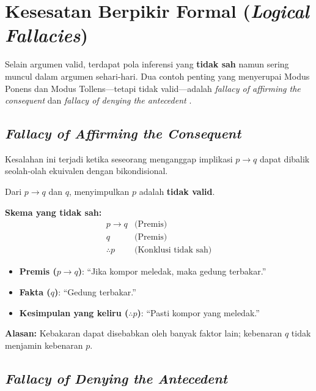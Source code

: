 \section{Kesesatan Berpikir Formal (\textit{Logical Fallacies})}

Selain argumen valid, terdapat pola inferensi yang \textbf{tidak sah} namun sering muncul dalam argumen sehari-hari. Dua contoh penting yang menyerupai Modus Ponens dan Modus Tollens---tetapi tidak valid---adalah \textit{fallacy of affirming the consequent} dan \textit{fallacy of denying the antecedent} \cite{rosen2019,iep_natded,libretexts_proofs}.

\subsection{\textit{Fallacy of Affirming the Consequent}}

Kesalahan ini terjadi ketika seseorang menganggap implikasi $p \rightarrow q$ dapat dibalik seolah-olah ekuivalen dengan bikondisional.

\begin{teorema}
Dari $p \rightarrow q$ dan $q$, menyimpulkan $p$ adalah \textbf{tidak valid}.
\end{teorema}

\textbf{Skema yang tidak sah:}
\[
\begin{array}{cl}
p \rightarrow q & \text{(Premis)} \\
q & \text{(Premis)} \\
\hline
\therefore p & \text{(Konklusi tidak sah)}
\end{array}
\]

\begin{contoh}
\begin{itemize}
    \item \textbf{Premis ($p \rightarrow q$)}: ``Jika kompor meledak, maka gedung terbakar.''
    \item \textbf{Fakta ($q$)}: ``Gedung terbakar.''
    \item \textbf{Kesimpulan yang keliru ($\therefore p$)}: ``Pasti kompor yang meledak.''
\end{itemize}
\textbf{Alasan:} Kebakaran dapat disebabkan oleh banyak faktor lain; kebenaran $q$ tidak menjamin kebenaran $p$.
\end{contoh}

\subsection{\textit{Fallacy of Denying the Antecedent}}

